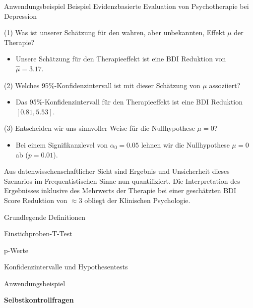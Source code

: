 \documentclass[
  8pt,
  ignorenonframetext,
]{beamer}
\providecommand{\tightlist}{%
  \setlength{\itemsep}{0pt}\setlength{\parskip}{0pt}}
\begin{document}
\begin{frame}{Anwendungsbeispiel}
\protect\hypertarget{anwendungsbeispiel-5}{}
Beispiel \textbar{} Evidenzbasierte Evaluation von Psychotherapie bei
Depression

\small

\noindent (1) Was ist unserer Schätzung für den wahren, aber
unbekannten, Effekt \(\mu\) der Therapie?

\begin{itemize}
\tightlist
\item
  Unsere Schätzung für den Therapieeffekt ist eine BDI Reduktion von
  \(\hat{\mu} = 3.17\).
\end{itemize}

\small

\noindent (2) Welches 95\%-Konfidenzintervall ist mit dieser Schätzung
von \(\mu\) assoziiert?

\begin{itemize}
\tightlist
\item
  Das 95\%-Konfidenzintervall für den Therapieeffekt ist eine BDI
  Reduktion \([0.81,5.53]\).
\end{itemize}

\small

\noindent (3) Entscheiden wir uns sinnvoller Weise für die Nullhypothese
\(\mu = 0\)?

\begin{itemize}
\tightlist
\item
  Bei einem Signifikanzlevel von \(\alpha_0 = 0.05\) lehnen wir die
  Nullhypothese \(\mu = 0\) ab (\(p = 0.01\)).
\end{itemize}

Aus datenwisschenschaftlicher Sicht sind Ergebnis und Unsicherheit
dieses Szenarios im Frequentistischen Sinne nun quantifiziert. Die
Interpretation des Ergebnisses inklusive des Mehrwerts der Therapie bei
einer geschätzten BDI Score Reduktion von \(\approx 3\) obliegt der
Klinischen Psychologie.
\end{frame}

\begin{frame}{}
\protect\hypertarget{section-12}{}
\large
\vfill

Grundlegende Definitionen

Einstichproben-T-Test

p-Werte

Konfidenzintervalle und Hypothesentests

Anwendungsbeispiel

\textbf{Selbstkontrollfragen} \vfill
\end{frame}
\end{document}

